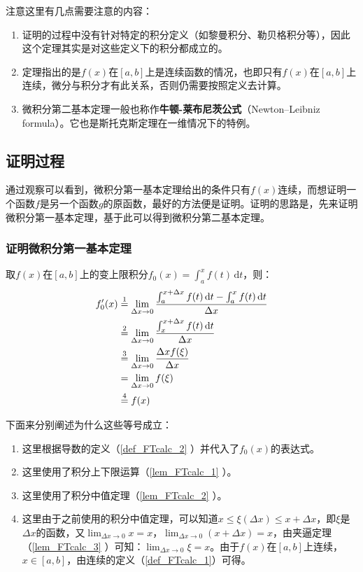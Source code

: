 注意这里有几点需要注意的内容：
\begin{enumerate}
\item 证明的过程中没有针对特定的积分定义（如黎曼积分、勒贝格积分等），因此这个定理其实是对这些定义下的积分都成立的。
\item 定理指出的是$f(x)$在$[a,b]$上是连续函数的情况，也即只有$f(x)$在$[a,b]$上连续，微分与积分才有此关系，否则仍需要按照定义去计算。
\item 微积分第二基本定理一般也称作\textbf{牛顿-莱布尼茨公式}（Newton–Leibniz formula）。它也是斯托克斯定理在一维情况下的特例。
\end{enumerate}

\subsection{证明过程}

通过观察可以看到，微积分第一基本定理给出的条件只有$f(x)$连续，而想证明一个函数$f$是另一个函数$g$的原函数，最好的方法便是证明。证明的思路是，先来证明微积分第一基本定理，基于此可以得到微积分第二基本定理。

\subsubsection{证明微积分第一基本定理}

取$f(x)$在$[a,b]$上的变上限积分$f_0(x)=\int_{a}^{x} f(t)\, \mathrm {d}t$，则：
$$\begin{align*}f_0'(x) &\overset{\mathrm{1}}{=} \lim_{\Delta x\to0}{\int_{a}^{x+\Delta x} f(t)\, \mathrm {d}t-\int_{a}^{x} f(t)\, \mathrm {d}t\over\Delta x}\\ 
&\overset{\mathrm{2}}{=}\lim_{\Delta x\to0}{\int_{x}^{x+\Delta x} f(t)\, \mathrm {d}t\over\Delta x}\\
&\overset{\mathrm{3}}{=}\lim_{\Delta x\to0}{\Delta xf(\xi)\over\Delta x} \\ 
&=\lim_{\Delta x\to0}f(\xi)\\ 
&\overset{\mathrm{4}}{=}f(x)\end{align*}$$

下面来分别阐述为什么这些等号成立：
\begin{enumerate}
\item 这里根据导数的定义（\autoref{def_FTcalc_2} ）并代入了$f_0(x)$的表达式。
\item 这里使用了积分上下限运算（\autoref{lem_FTcalc_1} ）。
\item 这里使用了积分中值定理（\autoref{lem_FTcalc_2} ）。
\item 这里由于之前使用的积分中值定理，可以知道$x\leq\xi(\Delta x)\leq x+\Delta x$，即$\xi$是$\Delta x$的函数，又$\lim_{\Delta x\to0}x=x$，$\lim_{\Delta x\to0}(x+\Delta x)=x$，由夹逼定理（\autoref{lem_FTcalc_3} ）可知：$\lim_{\Delta x\to0}\xi=x$。由于$f(x)$在$[a,b]$上连续，$x\in[a,b]$，由连续的定义（\autoref{def_FTcalc_1}）可得。
\end{enumerate}

